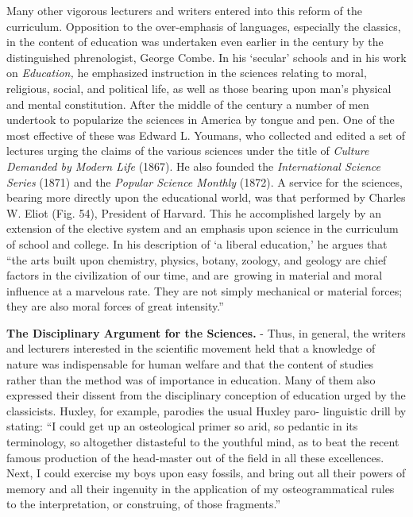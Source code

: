 \documentclass[]{book}
\begin{document}
Many other vigorous lecturers and writers entered into this reform of the curriculum. Opposition to the over-emphasis of languages, especially the classics, in the content of education was undertaken even earlier in the century by the distinguished phrenologist, George Combe. In his `secular' schools and in his work on \emph{Education,} he emphasized instruction in the sciences relating to moral, religious, social, and political life, as well as those bearing upon man's physical and mental constitution. After the middle of the century a number of men undertook to popularize the sciences in America by tongue and pen. One of the most effective of these was Edward L. Youmans, who collected and edited a set of lectures urging the claims of the various sciences under the title of \emph{Culture Demanded by Modern Life} (1867). He also founded the \emph{International Science Series} (1871) and the \emph{Popular Science Monthly} (1872). A service for the sciences, bearing more directly upon the educational world, was that performed by Charles W. Eliot (Fig. 54), President of Harvard. This he accomplished largely by an extension of the elective system and an emphasis upon science in the curriculum of school and college. In his description of `a liberal education,' he argues that ``the arts built upon chemistry, physics, botany, zoology, and geology are chief factors in the civilization of our time, and are~growing in material and moral influence at a marvelous rate. They are not simply mechanical or material forces; they are also moral forces of great intensity.''

\textbf{The Disciplinary Argument for the Sciences.} - Thus, in general, the writers and lecturers interested in the scientific movement held that a knowledge of nature was indispensable for human welfare and that the content of studies rather than the method was of importance in education. Many of them also expressed their dissent from the disciplinary conception of education urged by the classicists. Huxley, for example, parodies the usual Huxley paro- linguistic drill by stating: ``I could get up an osteological primer so arid, so pedantic in its terminology, so altogether distasteful to the youthful mind, as to beat the recent famous production of the head-master out of the field in all these excellences. Next, I could exercise my boys upon easy fossils, and bring out all their powers of memory and all their ingenuity in the application of my osteogrammatical rules to the interpretation, or construing, of those fragments.''
\end{document}
